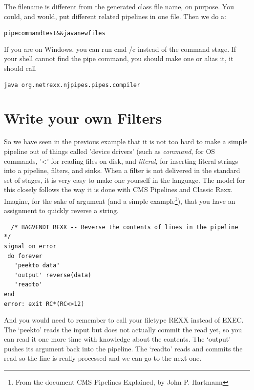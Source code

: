 The filename is different from the generated class file name, on purpose. You could, and would, put different related pipelines in one file.
Then we do a:
\begin{alltt}
pipe commandtest && java newfiles
\end{alltt}
If you are on Windows, you can run cmd /c instead of the command
stage. If your shell cannot find the pipe command, you should make one
or alias it, it should call 
\begin{verbatim}
java org.netrexx.njpipes.pipes.compiler
\end{verbatim}

\chapter{Write your own Filters}
So we have seen in the previous example that it is not too hard to
make a simple pipeline out of things called 'device drivers' (such as
\emph{command}, for OS commands, '<' for reading files on disk, and
\emph{literal}, for inserting literal strings into a pipeline,
filters, and sinks.
When a filter is not delivered in the standard set of stages, it is
very easy to make one yourself in the \nr{} language. The model for
this closely follows the way it is done with CMS Pipelines and Classic
Rexx.
Imagine, for the sake of argument (and a simple example\footnote{From
the document CMS Pipelines Explained, by John P. Hartmann}), that you have an
assignment to quickly reverse a string.
\begin{lstlisting}
  /* BAGVENDT REXX -- Reverse the contents of lines in the pipeline    */
signal on error
 do forever
   'peekto data'
   'output' reverse(data)
   'readto'
end
error: exit RC*(RC<>12)
\end{lstlisting}
And you would need to remember to call your filetype REXX instead of EXEC.  The ‘peekto’ reads the input but does not actually commit the read yet, so you can read it one more time with knowledge about the contents. The ‘output’ pushes its argument back into the pipeline. The ‘readto’ reads and commits the read so the line is really processed and we can go to the next one.

